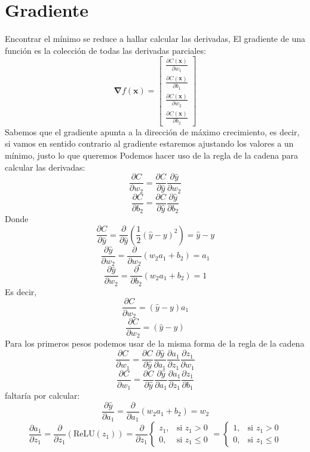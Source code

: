 \documentclass{article}
\begin{document}
	\section{Gradiente}
	Encontrar el mínimo se reduce a hallar calcular las derivadas, El gradiente de una función es la colección de todas las derivadas parciales:
	\[
\mathbf{\nabla} f(\mathbf{x}) =
\begin{bmatrix}
	\frac{\partial C(\mathbf{x})}{\partial w_1} \\
	\frac{\partial C(\mathbf{x})}{\partial b_1} \\
	\frac{\partial C(\mathbf{x})}{\partial w_2} \\
	\frac{\partial C(\mathbf{x})}{\partial b_2}
\end{bmatrix}
	\]
	Sabemos que el gradiente apunta a la dirección de máximo crecimiento, es decir, si vamos en sentido contrario al gradiente estaremos ajustando los valores a un mínimo, justo lo que queremos
	Podemos hacer uso de la regla de la cadena para calcular las derivadas:
	\[
	\frac{\partial C}{\partial w_2} = \frac{\partial C}{\partial \hat{y}}\frac{\partial \hat{y}}{\partial w_2}
	\]
	\[
	\frac{\partial C}{\partial b_2} = \frac{\partial C}{\partial \hat{y}}\frac{\partial \hat{y}}{\partial b_2}
	\]
	Donde
	\[
	\frac{\partial C}{\partial \hat{y}} = \frac{\partial }{\partial \hat{y}} (\frac{1}{2}(\hat{y} - y )^2) = \hat{y} - y 
	\]
	\[
	\frac{\partial \hat{y}}{\partial w_2} = \frac{\partial}{\partial w_2} (w_2a_1 + b_2) = a_1
	\]
	\[
	\frac{\partial \hat{y}}{\partial w_2} = \frac{\partial}{\partial b_2} (w_2a_1 + b_2) = 1
	\]
	Es decir,
	\[
	\frac{\partial C}{\partial w_2} = (\hat{y} - y)a_1
	\]
	\[
	\frac{\partial C}{\partial w_2} = (\hat{y} - y)
	\]
	Para los primeros pesos podemos usar de la misma forma de la regla de la cadena
	\[
	\frac{\partial C}{\partial w_1} = \frac{\partial C}{\partial \hat{y}} \frac{\partial \hat{y}}{\partial a_1} \frac{\partial a_1}{\partial z_1} \frac{\partial z_1}{\partial w_1}
	\]
	\[
	\frac{\partial C}{\partial w_1} = \frac{\partial C}{\partial \hat{y}} \frac{\partial \hat{y}}{\partial a_1} \frac{\partial a_1}{\partial z_1} \frac{\partial z_1}{\partial b_1}
	\]
	faltaría por calcular:
	\[
	\frac{\partial \hat{y}}{\partial a_1} = \frac{\partial}{\partial a_1}(w_2a_1 + b_2) = w_2
	\]
	\[
	\frac{\partial a_1}{\partial z_1} =  \frac{\partial}{\partial z_1}(\text{ReLU}(z_1)) =
	\frac{\partial}{\partial z_1}
		\begin{cases}
		z_1, & \text{si } z_1 > 0 \\
		0, & \text{si } z_1 \leq 0
	\end{cases}
	 =  
	\begin{cases}
		1, & \text{si } z_1 > 0 \\
		0, & \text{si } z_1 \leq 0
	\end{cases} 
	\]
\end{document}
